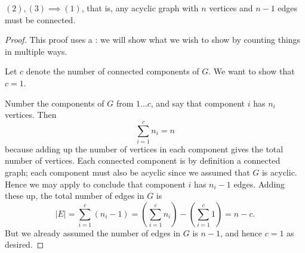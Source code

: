 \documentclass{tufte-handout}
\begin{document}
\begin{lem}
  $(2),(3) \implies (1)$, that is, any acyclic graph with $n$ vertices
  and $n-1$ edges must be connected.
\end{lem}

\begin{proof}
  This proof uses a : we will show what we
  wish to show by counting things in multiple ways.

  Let $c$ denote the number of connected components of $G$.  We want
  to show that $c = 1$.

  Number the components of $G$ from $1 \dots c$, and say that
  component $i$ has $n_i$ vertices.  Then \[ \sum_{i=1}^c n_i = n
  \] because adding up the number of vertices in each component gives
  the total number of vertices.  Each connected component is by
  definition a connected graph; each component must also be acyclic
  since we assumed that $G$ is acyclic.  Hence we may apply
   to conclude that component $i$ has $n_i - 1$
  edges.  Adding these up, the total number of edges in $G$ is
  \[ |E| = \sum_{i=1}^c (n_i - 1) = \left(\sum_{i=1}^c n_i \right) -
    \left(\sum_{i=1}^c 1 \right) = n - c. \] But we already assumed the
  number of edges in $G$ is $n-1$, and hence $c = 1$ as desired.
\end{proof}
\end{document}
